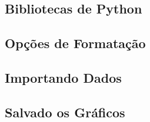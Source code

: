 \subsection{Bibliotecas de Python}

    

\subsection{Opções de Formatação}

    

\subsection{Importando Dados}

    

\subsection{Salvado os Gráficos}

    
